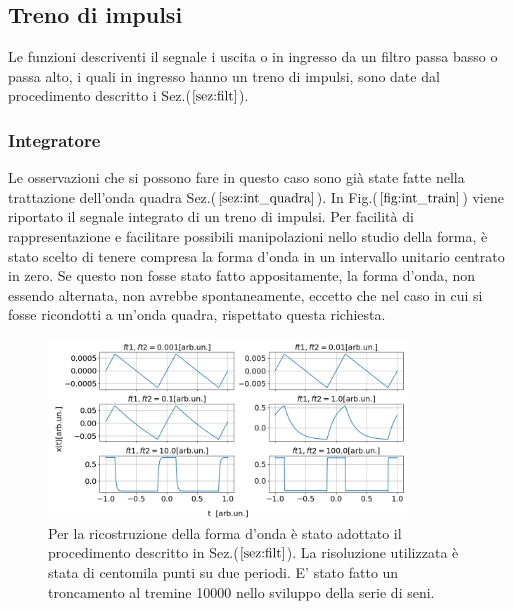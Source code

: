 \documentclass{article}
\begin{document}
    \subsection{Treno di impulsi}
    Le funzioni descriventi il segnale i uscita o in ingresso da un filtro passa basso
    o passa alto, i quali in ingresso hanno un treno di impulsi, 
    sono date dal procedimento descritto i Sez.($\ref{sez:filt}$).
  
            \subsubsection{Integratore}
            Le osservazioni che si possono fare in questo caso sono già state fatte 
            nella trattazione dell'onda quadra Sez.($\ref{sez:int_quadra}$).
            In Fig.($\ref{fig:int_train}$) viene riportato il segnale integrato di un treno di impulsi.
                Per facilità di rappresentazione e facilitare possibili manipolazioni
                nello studio della forma, è stato scelto di tenere compresa la forma 
                d'onda in un intervallo unitario centrato in zero.
                Se questo non fosse stato fatto appositamente, la forma d'onda, non 
                essendo alternata, non avrebbe spontaneamente, eccetto che nel caso 
                in cui si fosse ricondotti a un'onda quadra, rispettato questa richiesta.
        
                    \begin{figure}[H]
                        \centering
                        \includegraphics[width=0.85\textwidth]{int_train1.png} %
                        \caption{Per la ricostruzione della forma d'onda è stato adottato 
                        il procedimento descritto in Sez.($\ref{sez:filt}$).
                        La risoluzione utilizzata è stata di centomila punti su due periodi.
                        E' stato fatto un troncamento al tremine 10000
                        nello sviluppo della serie di seni.}
                        \label{fig:int_train}
                    \end{figure}               
\end{document}
